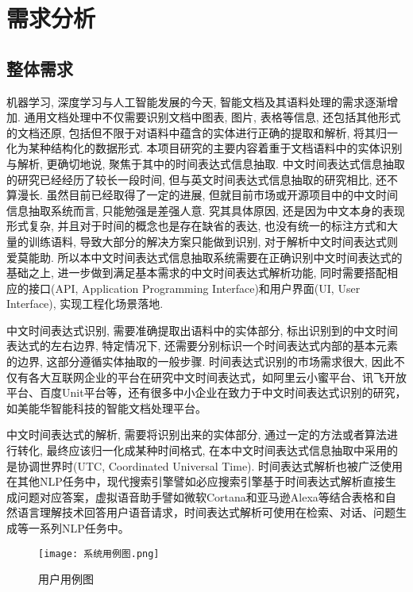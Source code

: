 
\chapter{需求分析}

\section{整体需求}

机器学习, 深度学习与人工智能发展的今天, 智能文档及其语料处理的需求逐渐增加.
通用文档处理中不仅需要识别文档中图表, 图片, 表格等信息, 还包括其他形式的文档还原, 包括但不限于对语料中蕴含的实体进行正确的提取和解析, 将其归一化为某种结构化的数据形式.
本项目研究的主要内容着重于文档语料中的实体识别与解析, 更确切地说, 聚焦于其中的时间表达式信息抽取.
中文时间表达式信息抽取的研究已经经历了较长一段时间, 但与英文时间表达式信息抽取的研究相比, 还不算漫长.
虽然目前已经取得了一定的进展, 但就目前市场或开源项目中的中文时间信息抽取系统而言, 只能勉强是差强人意.
究其具体原因, 还是因为中文本身的表现形式复杂, 并且对于时间的概念也是存在缺省的表达, 也没有统一的标注方式和大量的训练语料, 导致大部分的解决方案只能做到识别, 对于解析中文时间表达式则爱莫能助.
所以本中文时间表达式信息抽取系统需要在正确识别中文时间表达式的基础之上, 进一步做到满足基本需求的中文时间表达式解析功能, 同时需要搭配相应的接口(API, Application Programming Interface)和用户界面(UI, User Interface), 实现工程化场景落地.

中文时间表达式识别, 需要准确提取出语料中的实体部分, 标出识别到的中文时间表达式的左右边界, 特定情况下, 还需要分别标识一个时间表达式内部的基本元素的边界, 这部分遵循实体抽取的一般步骤.
时间表达式识别的市场需求很大, 因此不仅有各大互联网企业的平台在研究中文时间表达式，如阿里云小蜜平台、讯飞开放平台、百度Unit平台等，还有很多中小企业在致力于中文时间表达式识别的研究，如美能华智能科技的智能文档处理平台。

中文时间表达式的解析, 需要将识别出来的实体部分, 通过一定的方法或者算法进行转化, 最终应该归一化成某种时间格式, 在本中文时间表达式信息抽取中采用的是协调世界时(UTC, Coordinated Universal Time).
时间表达式解析也被广泛使用在其他NLP任务中，现代搜索引擎譬如必应搜索引擎基于时间表达式解析直接生成问题对应答案，虚拟语音助手譬如微软Cortana和亚马逊Alexa等结合表格和自然语言理解技术回答用户语音请求，时间表达式解析可使用在检索、对话、问题生成等一系列NLP任务中。

\begin{figure}[h]
    \centering
    \texttt{[image: 系统用例图.png]}
    \caption{用户用例图}
    \label{fig:badge}
\end{figure}


